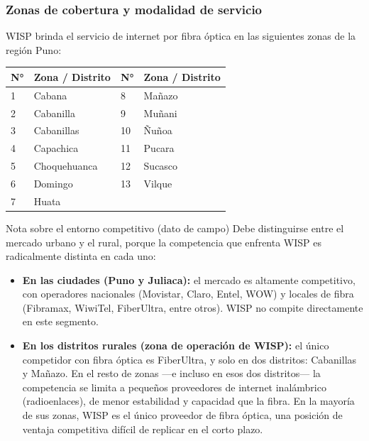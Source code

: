 \subsubsection{Zonas de cobertura y modalidad de servicio}

WISP brinda el servicio de internet por fibra óptica en las siguientes zonas de
la región Puno:

\begin{center}
\label{tab:zonas}
\begin{tabularx}{\textwidth}{C{1.1cm} X C{1.1cm} X}
\toprule
\textbf{N°} & \textbf{Zona / Distrito} & \textbf{N°} & \textbf{Zona / Distrito} \\
 & Cabana        & 8  & Mañazo  \\
2 & Cabanilla     & 9  & Muñani  \\
3 & Cabanillas    & 10 & Ñuñoa   \\
4 & Capachica     & 11 & Pucara  \\
5 & Choquehuanca  & 12 & Sucasco \\
6 & Domingo       & 13 & Vilque  \\
7 & Huata         &    &         \\
\bottomrule
\end{tabularx}
\end{center}

\begin{upeubox}{Nota sobre el entorno competitivo (dato de campo)}
Debe distinguirse entre el mercado urbano y el rural, porque la competencia que
enfrenta WISP es radicalmente distinta en cada uno:
\begin{itemize}[leftmargin=1.4em]
  \item \textbf{En las ciudades (Puno y Juliaca):} el mercado es altamente
  competitivo, con operadores nacionales (Movistar, Claro, Entel, WOW) y locales
  de fibra (Fibramax, WiwiTel, FiberUltra, entre otros). WISP no compite
  directamente en este segmento.
  \item \textbf{En los distritos rurales (zona de operación de WISP):} el único
  competidor con fibra óptica es FiberUltra, y solo en dos distritos: Cabanillas
  y Mañazo. En el resto de zonas ---e incluso en esos dos distritos--- la
  competencia se limita a pequeños proveedores de internet inalámbrico
  (radioenlaces), de menor estabilidad y capacidad que la fibra. En la mayoría de
  sus zonas, WISP es el único proveedor de fibra óptica, una posición de ventaja
  competitiva difícil de replicar en el corto plazo.
\end{itemize}
\end{upeubox}

